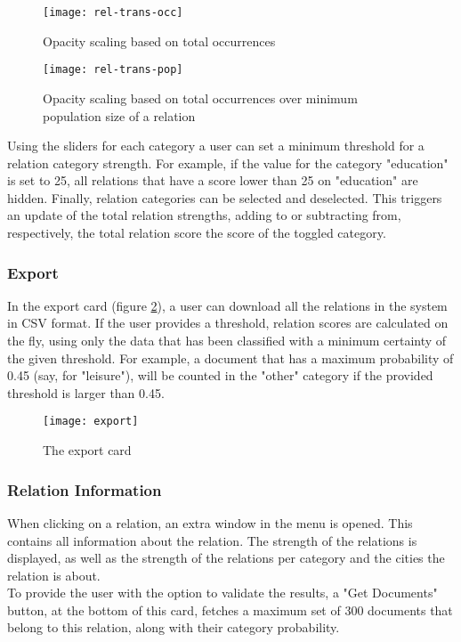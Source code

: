 \begin{figure}[H]
    \centering
    \begin{minipage}{0.9\textwidth}
        \centering
        \texttt{[image: rel-trans-occ]}
        \caption{Opacity scaling based on total occurrences}
        \label{fig:rel-trans-occ}
    \end{minipage}\hfill
    \begin{minipage}{0.9\textwidth}
        \centering
        \texttt{[image: rel-trans-pop]}
        \caption{Opacity scaling based on total occurrences over minimum population size of a relation}
        \label{fig:rel-trans-pop}
    \end{minipage}
\end{figure}

Using the sliders for each category a user can set a minimum threshold for a relation category strength. For example, if the value for the category "education" is set to 25, all relations that have a score lower than 25 on "education" are hidden.
Finally, relation categories can be selected and deselected. This triggers an update of the total relation strengths, adding to or subtracting from, respectively, the total relation score the score of the toggled category.


\subsubsection{Export}
In the export card (figure \ref{fig:export}), a user can download all the relations in the system in CSV format. If the user provides a threshold, relation scores are calculated on the fly, using only the data that has been classified with a minimum certainty of the given threshold. For example, a document that has a maximum probability of 0.45 (say, for "leisure"), will be counted in the "other" category if the provided threshold is larger than 0.45.

\begin{figure}[H]
    \centering
    \texttt{[image: export]}
    \caption{The export card}
    \label{fig:export}
\end{figure}

\subsubsection{Relation Information}\label{sec:rel-info}

When clicking on a relation, an extra window in the menu is opened. This contains all information about the relation. The strength of the relations is displayed, as well as the strength of the relations per category and the cities the relation is about.\\
To provide the user with the option to validate the results, a "Get Documents" button, at the bottom of this card, fetches a maximum set of 300 documents that belong to this relation, along with their category probability.


